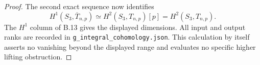 \begin{proof}
The second exact sequence now identifies
\[
 H^1(S_3,\overline T_{n,p})
       \simeq H^2(S_3,T_{n,p})[p]
       =H^2(S_3,T_{n,p}).
\]
The $H^1$ column of B.13 gives the displayed dimensions.
All input and output ranks are recorded in
\texttt{g\_integral\_cohomology.json}.
This calculation by itself asserts no vanishing beyond
the displayed range and evaluates no specific higher
lifting obstruction.
\end{proof}

